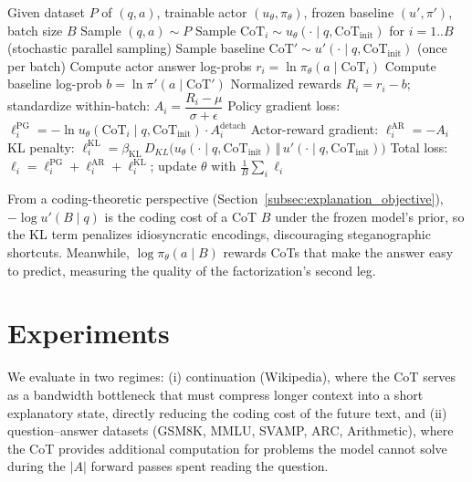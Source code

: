 \documentclass{article} %
\begin{document}
 
\begin{algorithm}[t]
\caption{Markovian Training with GRPO-Style Batch Baseline}
\label{alg:markovian_training}
\begin{algorithmic}[1]
\STATE Given dataset $P$ of $(q,a)$, trainable actor $(u_\theta,\pi_\theta)$, frozen baseline $(u',\pi')$, batch size $B$
  \STATE Sample $(q,a) \sim P$
  \STATE Sample $\text{CoT}_i \sim u_\theta(\cdot\mid q,\text{CoT}_{\text{init}})$ for $i=1..B$ (stochastic parallel sampling)
  \STATE Sample baseline $\text{CoT}' \sim u'(\cdot\mid q,\text{CoT}_{\text{init}})$ (once per batch)
  \STATE Compute actor answer log-probs $r_i = \ln \pi_\theta(a\mid \text{CoT}_i)$
  \STATE Compute baseline log-prob $b = \ln \pi'(a\mid \text{CoT}')$
  \STATE Normalized rewards $R_i = r_i - b$; standardize within-batch: $A_i = \dfrac{R_i - \mu}{\sigma + \epsilon}$
  \STATE Policy gradient loss: $\ell^{\text{PG}}_i = -\ln u_\theta(\text{CoT}_i\mid q,\text{CoT}_{\text{init}}) \cdot A_i^{\mathrm{detach}}$
  \STATE Actor-reward gradient: $\ell^{\text{AR}}_i = -A_i$ 
  \STATE KL penalty: $\ell^{\text{KL}}_i = \beta_{\text{KL}}\, D_{\!KL}\big(u_\theta(\cdot\mid q,\text{CoT}_{\text{init}})\,\Vert\,u'(\cdot\mid q,\text{CoT}_{\text{init}})\big)$
  \STATE Total loss: $\ell_i = \ell^{\text{PG}}_i + \ell^{\text{AR}}_i + \ell^{\text{KL}}_i$; update $\theta$ with $\tfrac{1}{B}\sum_i \ell_i$
\ENDFOR
\end{algorithmic}
\end{algorithm}

From a coding-theoretic perspective (Section~\ref{subsec:explanation_objective}), $-\log u'(B\mid q)$ is the coding cost of a CoT $B$ under the frozen model's prior, so the KL term penalizes idiosyncratic encodings, discouraging steganographic shortcuts. Meanwhile, $\log \pi_\theta(a\mid B)$ rewards CoTs that make the answer easy to predict, measuring the quality of the factorization's second leg.



\section{Experiments}
\label{sec:experiments}


\noindent We evaluate in two regimes: (i) continuation (Wikipedia), where the CoT serves as a bandwidth bottleneck that must compress longer context into a short explanatory state, directly reducing the coding cost of the future text, and (ii) question--answer datasets (GSM8K, MMLU, SVAMP, ARC, Arithmetic), where the CoT provides additional computation for problems the model cannot solve during the $|A|$ forward passes spent reading the question.
\end{document}
